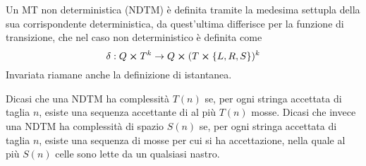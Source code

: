 \documentclass{subfiles}
\begin{document}
Un MT non deterministica (NDTM) è definita tramite la medesima settupla della sua corrispondente deterministica, da quest'ultima differisce per la funzione di transizione,
che nel caso non deterministico è definita come
\[
    \delta : Q \cp T^{k} \to Q \cp (T \cp \Set{L, R, S})^{k}
\]
Invariata riamane anche la definizione di istantanea.

\begin{Definition*}
    Dicasi che una NDTM ha complessità \(T(n)\) se, per ogni stringa accettata di taglia \(n\), esiste una sequenza accettante di al più \(T(n)\) mosse.
    Dicasi che invece una NDTM ha complessità di spazio \(S(n)\) se, per ogni stringa accettata di taglia \(n\), esiste una sequenza di mosse per cui si ha accettazione,
    nella quale al più \(S(n)\) celle sono lette da un qualsiasi nastro.
\end{Definition*}
\end{document}
